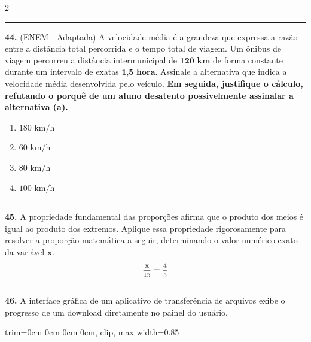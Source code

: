 \documentclass[twoside, 10pt, a4paper]{article}
\newlength{\espacoPreQuestao}\setlength{\espacoPreQuestao}{0.1cm}
\newlength{\espacoQuestao}\setlength{\espacoQuestao}{0.2cm}
\newcommand{\larguraTikz}{0.85\linewidth}
\begin{document}
\begin{multicols*}{2}
\noindent\textcolor{CorLinha}{\rule{\linewidth}{0.5pt}} 
\par\vspace{\espacoPreQuestao}
\textbf{44.} (ENEM - Adaptada) A velocidade média é a grandeza que expressa a razão entre a distância total percorrida e o tempo total de viagem. Um ônibus de viagem percorreu a distância intermunicipal de $ \textbf{120 km} $ de forma constante durante um intervalo de exatas $ \textbf{1,5 hora} $. Assinale a alternativa que indica a velocidade média desenvolvida pelo veículo. \textbf{Em seguida, justifique o cálculo, refutando o porquê de um aluno desatento possivelmente assinalar a alternativa (a).}
\begin{enumerate}[label=\alph*)]
    \item $ 180 \text{ km/h} $
    \item $ 60 \text{ km/h} $
    \item $ 80 \text{ km/h} $
    \item $ 100 \text{ km/h} $
\end{enumerate}
\par\vspace{\espacoQuestao}

\noindent\textcolor{CorLinha}{\rule{\linewidth}{0.5pt}} 
\par\vspace{\espacoPreQuestao}
\textbf{45.} A propriedade fundamental das proporções afirma que o produto dos meios é igual ao produto dos extremos. Aplique essa propriedade rigorosamente para resolver a proporção matemática a seguir, determinando o valor numérico exato da variável $ \textbf{x} $.
$$ \mfrac{\textbf{x}}{15} = \mfrac{4}{5} $$
\par\vspace{\espacoQuestao}

\noindent\textcolor{CorLinha}{\rule{\linewidth}{0.5pt}} 
\par\vspace{\espacoPreQuestao}
\textbf{46.} A interface gráfica de um aplicativo de transferência de arquivos exibe o progresso de um download diretamente no painel do usuário.
\begin{center}
\begin{adjustbox}{trim=0cm 0cm 0cm 0cm, clip, max width=\larguraTikz}
\end{adjustbox}
\end{center}
\end{multicols*}
\end{document}
